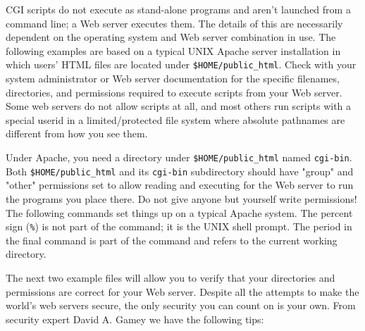 {CGI scripts do not execute as stand-alone programs and
aren't launched from a command line; a Web server
executes them. The details of this are necessarily dependent on the
operating system and Web server combination in use. The following
examples are based on a typical UNIX Apache server installation in
which users' HTML files are located under
\texttt{\$HOME/public\_html}. Check with your system administrator or
Web server documentation for the specific filenames, directories, and
permissions required to execute scripts from your Web server. Some web
servers do not allow scripts at all, and most others run scripts with a
special userid in a limited/protected file system where absolute
pathnames are different from how you see them.

Under Apache, you need a directory under
\texttt{\$HOME/public\_html} named \texttt{cgi-bin}. Both
\texttt{\$HOME/public\_html} and its \texttt{cgi-bin} subdirectory
should have "group" and
"other" permissions set to allow
reading and executing for the Web server to run the programs you place
there. Do not give anyone but yourself write permissions! The following
commands set things up on a typical Apache system. The percent sign
(\texttt{\%}) is not part of the command; it is the UNIX shell prompt.
The period in the final command is part of the command and refers to
the current working directory.


The next two example files will allow you to verify that your
directories and permissions are correct for your Web server.
Despite all the attempts to make the world's web servers secure,
the only security you can count on is your own. From security expert
David A. Gamey we have the following tips:

}
